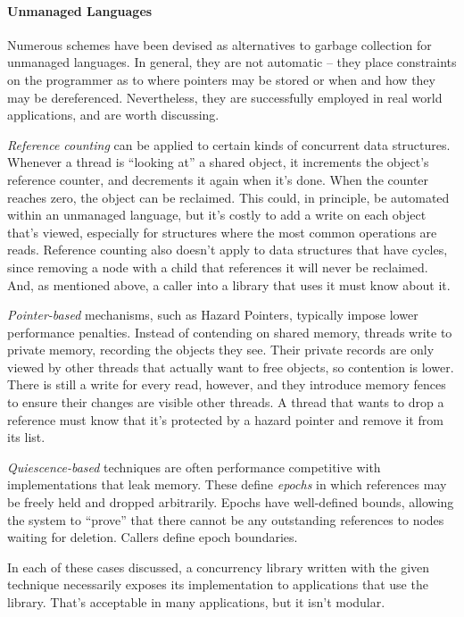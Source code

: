 \paragraph{Unmanaged Languages} Numerous schemes have been devised as alternatives to garbage collection for unmanaged languages.  In general, they are not automatic -- they place constraints on the programmer as to where pointers may be stored or when and how they may be dereferenced.  Nevertheless, they are successfully employed in real world applications, and are worth discussing.

\textit{Reference counting} can be applied to certain kinds of concurrent data structures\cite{DMMS}\cite{GPST09}.  Whenever a thread is ``looking at'' a shared object, it increments the object's reference counter, and decrements it again when it's done.  When the counter reaches zero, the object can be reclaimed.  This could, in principle, be automated within an unmanaged language, but it's costly to add a write on each object that's viewed, especially for structures where the most common operations are reads.  Reference counting also doesn't apply to data structures that have cycles, since removing a node with a child that references it will never be reclaimed.  And, as mentioned above, a caller into a library that uses it must know about it.

\textit{Pointer-based} mechanisms, such as Hazard Pointers\cite{HP}\cite{DTA}, typically impose lower performance penalties.  Instead of contending on shared memory, threads write to private memory, recording the objects they see.  Their private records are only viewed by other threads that actually want to free objects, so contention is lower.  There is still a write for every read, however, and they introduce memory fences to ensure their changes are visible other threads.  A thread that wants to drop a reference must know that it's protected by a hazard pointer and remove it from its list.

\textit{Quiescence-based} techniques\cite{FraserH07}\cite{Harris}\cite{Hart} are often performance competitive with implementations that leak memory.  These define \textit{epochs} in which references may be freely held and dropped arbitrarily.  Epochs have well-defined bounds, allowing the system to ``prove'' that there cannot be any outstanding references to nodes waiting for deletion.  Callers define epoch boundaries.

In each of these cases discussed, a concurrency library written with the given technique necessarily exposes its implementation to applications that use the library.  That's acceptable in many applications, but it isn't modular.

